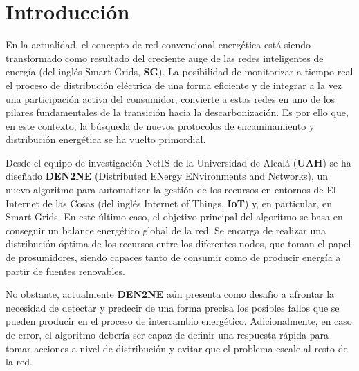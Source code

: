 \newpage
\section{Introducción}
\vspace{0.3cm}

En la actualidad, el concepto de red convencional energética está siendo transformado como resultado del creciente auge de las redes inteligentes de energía (del inglés Smart Grids, \textbf{SG}). La posibilidad de monitorizar a tiempo real el proceso de distribución eléctrica de una forma eficiente y de integrar a la vez una participación activa del consumidor, convierte a estas redes en uno de los pilares fundamentales de la transición hacia la descarbonización. Es por ello que, en este contexto, la búsqueda de nuevos protocolos de encaminamiento y distribución energética se ha vuelto primordial. 

\vspace{0.3cm}

Desde el equipo de investigación NetIS de la Universidad de Alcalá (\textbf{UAH}) se ha diseñado \textbf{DEN2NE} (Distributed ENergy ENvironments and Networks), un nuevo algoritmo para automatizar la gestión de los recursos en entornos de El Internet de las Cosas (del inglés Internet of Things, \textbf{IoT}) y, en particular, en Smart Grids. En este último caso, el objetivo principal del algoritmo se basa en conseguir un balance energético global de la red. Se encarga de realizar una distribución óptima de los recursos entre los diferentes nodos, que toman el papel de prosumidores, siendo capaces tanto de consumir como de producir energía a partir de fuentes renovables.

\vspace{0.3cm}

No obstante, actualmente \textbf{DEN2NE} aún presenta como desafío a afrontar la necesidad de detectar y predecir de una forma precisa los posibles fallos que se pueden producir en el proceso de intercambio energético. Adicionalmente, en caso de error, el algoritmo debería ser capaz de definir una respuesta rápida para tomar acciones a nivel de distribución y evitar que el problema escale al resto de la red.


\begin{comment}
\vspace{0.3cm}

\begin{figure}[!htb]
	\centering
    \begin{subfigure}[b]{0.47\textwidth}
         \centering
         
         \label{fig:outOfband}
         \caption{Arquitectura Out-Of-Band}
     \end{subfigure}
     \hfill
     \begin{subfigure}[b]{0.47\textwidth}
         \centering
         
         \label{fig:inband}
         \caption{Arquitectura In-Band}
     \end{subfigure}
     \caption{Arquitecturas de conexión con el agente controlador en las redes SDN.}
    \label{fig:intro}
\end{figure}
\end{comment}

